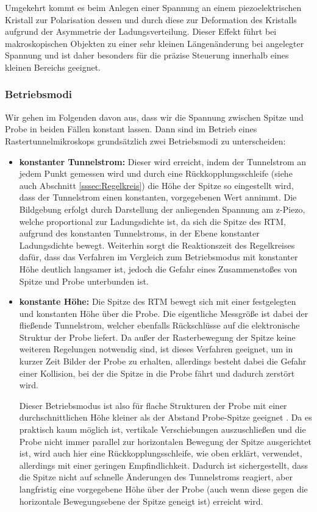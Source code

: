 \documentclass[10pt, a4paper]{article}
\begin{document}
Umgekehrt kommt es beim Anlegen einer Spannung an einem piezoelektrischen Kristall zur Polarisation dessen und durch diese zur Deformation des Kristalls aufgrund der Asymmetrie der Ladungsverteilung.
Dieser Effekt führt bei makroskopischen Objekten zu einer sehr kleinen Längenänderung bei angelegter Spannung und ist daher besonders für die präzise Steuerung innerhalb eines kleinen Bereichs geeignet.

\subsubsection{Betriebsmodi}
\label{sec:betriebsmodi}
Wir gehen im Folgenden davon aus, dass wir die Spannung zwischen Spitze und Probe in beiden Fällen konstant lassen.
Dann sind im Betrieb eines Rastertunnelmikroskops grundsätzlich zwei Betriebsmodi zu unterscheiden:
\begin{itemize}
  \item \textbf{konstanter Tunnelstrom:} Dieser wird erreicht, indem der Tunnelstrom an jedem Punkt gemessen wird und durch eine Rückkopplungsschleife (siehe auch Abschnitt \ref{sssec:Regelkreis}) die Höhe der Spitze so eingestellt wird, dass der Tunnelstrom einen konstanten, vorgegebenen Wert annimmt.
Die Bildgebung erfolgt durch Darstellung der anliegenden Spannung am z-Piezo, welche proportional zur Ladungsdichte ist, da sich die Spitze des RTM, aufgrund des konstanten Tunnelstroms, in der Ebene konstanter Ladungsdichte bewegt.
Weiterhin sorgt die Reaktionszeit des Regelkreises dafür, dass das Verfahren im Vergleich zum Betriebsmodus mit konstanter Höhe deutlich langsamer ist, jedoch die Gefahr eines Zusammenstoßes von Spitze und Probe unterbunden ist.

  \item \textbf{konstante Höhe:} Die Spitze des RTM bewegt sich mit einer festgelegten und konstanten Höhe über die Probe.
Die eigentliche Messgröße ist dabei der fließende Tunnelstrom, welcher ebenfalls Rückschlüsse auf die elektronische Struktur der Probe liefert.
Da außer der Rasterbewegung der Spitze keine weiteren Regelungen notwendig sind, ist dieses Verfahren geeignet, um in kurzer Zeit Bilder der Probe zu erhalten, allerdings besteht dabei die Gefahr einer Kollision, bei der die Spitze in die Probe fährt und dadurch zerstört wird.

Dieser Betriebsmodus ist also für flache Strukturen der Probe mit einer durchschnittlichen Höhe kleiner als der Abstand Probe-Spitze geeignet \cite{colton}.
Da es praktisch kaum möglich ist, vertikale Verschiebungen auszuschließen und die Probe nicht immer parallel zur horizontalen Bewegung der Spitze ausgerichtet ist, wird auch hier eine Rück\-kopp\-lungs\-schlei\-fe, wie oben erklärt, verwendet, allerdings mit einer geringen Empfindlichkeit. Dadurch ist sichergestellt, dass die Spitze nicht auf schnelle Änderungen des Tunnelstroms reagiert, aber langfristig eine vorgegebene Höhe über der Probe (auch wenn diese gegen die horizontale Bewegungsebene der Spitze geneigt ist) erreicht wird.
\end{itemize}
\end{document}
